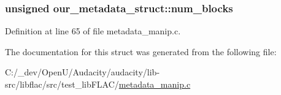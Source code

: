 \subsubsection[{\texorpdfstring{num\+\_\+blocks}{num_blocks}}]{\setlength{\rightskip}{0pt plus 5cm}unsigned our\+\_\+metadata\+\_\+struct\+::num\+\_\+blocks}\hypertarget{structour__metadata__struct_aac3aacb18be179c40e7622b00619dfa5}{}\label{structour__metadata__struct_aac3aacb18be179c40e7622b00619dfa5}


Definition at line 65 of file metadata\+\_\+manip.\+c.



The documentation for this struct was generated from the following file\+:\begin{DoxyCompactItemize}
\item 
C\+:/\+\_\+dev/\+Open\+U/\+Audacity/audacity/lib-\/src/libflac/src/test\+\_\+lib\+F\+L\+A\+C/\hyperlink{metadata__manip_8c}{metadata\+\_\+manip.\+c}\end{DoxyCompactItemize}

